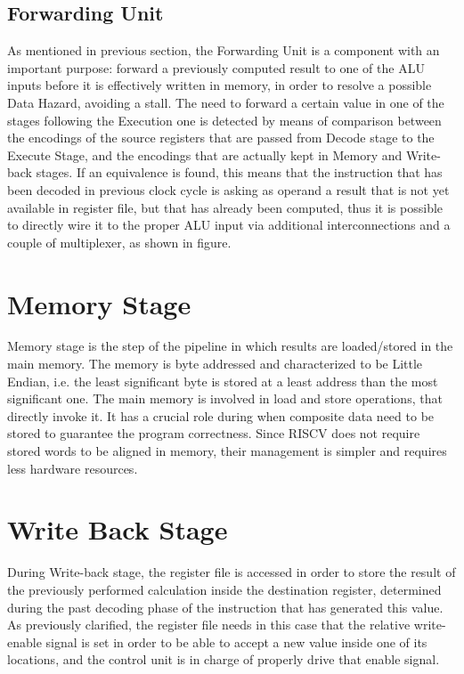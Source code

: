 \subsection{Forwarding Unit}

As mentioned in previous section, the Forwarding Unit is a component with an important purpose: forward a previously computed result to one of the ALU inputs
before it is effectively written in memory, in order to resolve a possible Data Hazard, avoiding a stall.
The need to forward a certain value in one of the stages following the Execution one is detected by means of comparison between the encodings of the source registers 
that are passed from Decode stage to the Execute Stage, and the encodings that are actually kept in Memory and Write-back stages.
If an equivalence is found, this means that the instruction that has been decoded in previous clock cycle is asking as operand a result that is not yet available 
in register file, but that has already been computed, thus it is possible to directly wire it to the proper ALU input via additional interconnections
and a couple of multiplexer, as shown in figure.  

\section{Memory Stage}

Memory stage is the step of the pipeline in which results are loaded/stored in the main memory.
The memory is byte addressed and characterized to be Little Endian, i.e. the least significant byte is stored at a least address than the most significant one.
The main memory is involved in load and store operations, that directly invoke it. It has a crucial role during when composite data need to be stored to guarantee 
the program correctness.
Since RISCV does not require stored words to be aligned in memory, their management is simpler and requires less hardware resources.

\section{Write Back Stage}

During Write-back stage, the register file is accessed in order to store the result of the previously performed calculation inside the destination register,
determined during the past decoding phase of the instruction that has generated this value.
As previously clarified, the register file needs in this case that the relative write-enable signal is set in order to be able to accept a new value inside one 
of its locations, and the control unit is in charge of properly drive that enable signal.